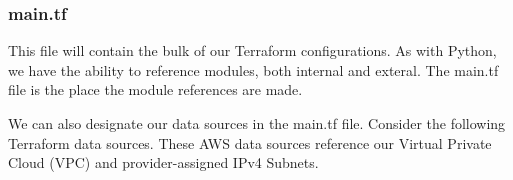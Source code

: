 \hypertarget{main.tf}{%
   \subsubsection{main.tf}\label{main.tf}}

This file will contain the bulk of our Terraform configurations. As with
Python, we have the ability to reference modules, both internal and
exteral. The main.tf file is the place the module references are made.

\begin{Shaded}
   \begin{Highlighting}[]
       \NormalTok{ \{}
      \NormalTok{  = }
      \NormalTok{ = }

      \NormalTok{        = }
      \NormalTok{ = }

      \NormalTok{ = [}\NormalTok{]}
      \NormalTok{       = [}\NormalTok{, }\NormalTok{, }\NormalTok{]}
      \NormalTok{        = [}\NormalTok{]}
      \NormalTok{\}}
   \end{Highlighting}
\end{Shaded}

We can also designate our data sources in the main.tf file. Consider the
following Terraform data sources. These AWS data sources reference our
Virtual Private Cloud (VPC) and provider-assigned IPv4 Subnets.

\begin{Shaded}
   \begin{Highlighting}[]
        \NormalTok{ \{}
      \NormalTok{\}}

        \NormalTok{ \{}
      \NormalTok{\}}
   \end{Highlighting}
\end{Shaded}

